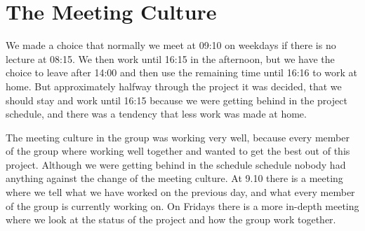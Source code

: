 \section{The Meeting Culture}
We made a choice that normally we meet at 09:10 on weekdays if there is no lecture at 08:15. We then work until 16:15 in the afternoon, but we have the choice to leave after 14:00 and then use the remaining time  until 16:16 to work at home. But approximately halfway through the project it was decided, that we should stay and work until 16:15 because we were getting behind in the project schedule, and there was a tendency that less work was made at home.

The meeting culture in the group was working very well, because every member of the group where working well together and wanted to get the best out of this project. Although we were getting behind in the schedule schedule nobody had anything against the change of the meeting culture. At 9.10 there is a meeting where we tell what we have worked on the previous day, and what every member of the group is currently working on. On Fridays there is a more in-depth meeting where we look at the status of the project and how the group work together.